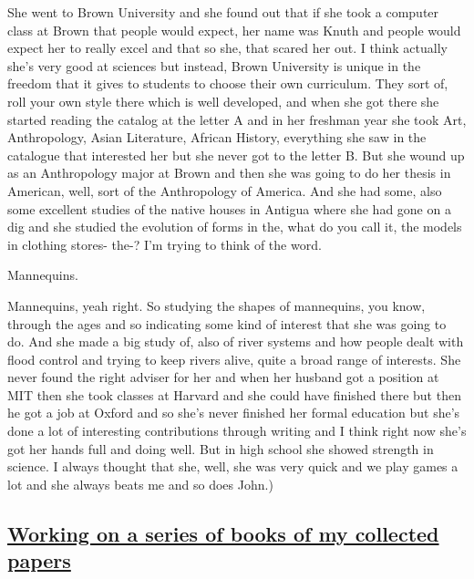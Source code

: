 \documentclass[]{article}
\begin{document}
She went to Brown University and she found out that if she took a
computer class at Brown that people would expect, her name was Knuth and
people would expect her to really excel and that so she, that scared her
out. I think actually she's very good at sciences but instead, Brown
University is unique in the freedom that it gives to students to choose
their own curriculum. They sort of, roll your own style there which is
well developed, and when she got there she started reading the catalog
at the letter A and in her freshman year she took Art, Anthropology,
Asian Literature, African History, everything she saw in the catalogue
that interested her but she never got to the letter B. But she wound up
as an Anthropology major at Brown and then she was going to do her
thesis in American, well, sort of the Anthropology of America. And she
had some, also some excellent studies of the native houses in Antigua
where she had gone on a dig and she studied the evolution of forms in
the, what do you call it, the models in clothing stores- the-? I'm
trying to think of the word.

Mannequins.

Mannequins, yeah right. So studying the shapes of mannequins, you know,
through the ages and so indicating some kind of interest that she was
going to do. And she made a big study of, also of river systems and how
people dealt with flood control and trying to keep rivers alive, quite a
broad range of interests. She never found the right adviser for her and
when her husband got a position at MIT then she took classes at Harvard
and she could have finished there but then he got a job at Oxford and so
she's never finished her formal education but she's done a lot of
interesting contributions through writing and I think right now she's
got her hands full and doing well. But in high school she showed
strength in science. I always thought that she, well, she was very quick
and we play games a lot and she always beats me and so does John.)

\subsection{\texorpdfstring{\href{http://webofstories.com/play/17155}{Working
on a series of books of my collected
papers}}{Working on a series of books of my collected papers}}\label{working-on-a-series-of-books-of-my-collected-papers}
\end{document}
